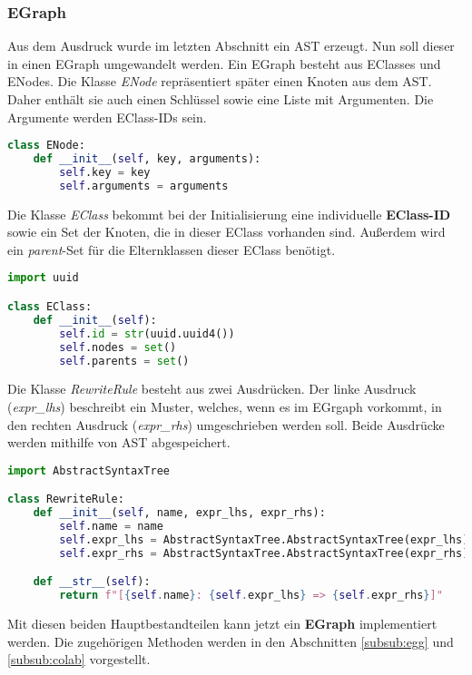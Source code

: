 \subsubsection{EGraph}

Aus dem Ausdruck wurde im letzten Abschnitt ein AST erzeugt. Nun soll dieser in einen EGraph umgewandelt werden. Ein EGraph besteht aus EClasses und ENodes.
Die Klasse \textit{ENode} repräsentiert später einen Knoten aus dem AST. Daher enthält sie auch einen Schlüssel sowie eine Liste mit Argumenten. Die Argumente werden 
EClass-IDs sein.

\begin{lstlisting}[language=Python, caption=Klasse \textit{ENode}]
class ENode:
    def __init__(self, key, arguments):
        self.key = key
        self.arguments = arguments
\end{lstlisting}

Die Klasse \textit{EClass} bekommt bei der Initialisierung eine individuelle \textbf{EClass-ID} sowie ein Set der Knoten, die in dieser EClass vorhanden sind. Außerdem
wird ein \textit{parent}-Set für die Elternklassen dieser EClass benötigt.

\begin{lstlisting}[language=Python, caption=Klasse \textit{EClass}]
import uuid

class EClass:
    def __init__(self):
        self.id = str(uuid.uuid4())
        self.nodes = set()
        self.parents = set()
\end{lstlisting}

Die Klasse \textit{RewriteRule} besteht aus zwei Ausdrücken. Der linke Ausdruck (\textit{expr\_lhs}) beschreibt ein Muster, welches, wenn es im EGrgaph vorkommt, in den
rechten Ausdruck (\textit{expr\_rhs}) umgeschrieben werden soll.
Beide Ausdrücke werden mithilfe von AST abgespeichert.

\begin{lstlisting}[language=Python, caption=Klasse \textit{RewriteRule}]
import AbstractSyntaxTree

class RewriteRule:
    def __init__(self, name, expr_lhs, expr_rhs):
        self.name = name
        self.expr_lhs = AbstractSyntaxTree.AbstractSyntaxTree(expr_lhs)
        self.expr_rhs = AbstractSyntaxTree.AbstractSyntaxTree(expr_rhs)

    def __str__(self):
        return f"[{self.name}: {self.expr_lhs} => {self.expr_rhs}]"
\end{lstlisting}


Mit diesen beiden Hauptbestandteilen kann jetzt ein \textbf{EGraph} implementiert werden. 
Die zugehörigen Methoden werden in den Abschnitten \ref{subsub:egg} und \ref{subsub:colab} vorgestellt.

